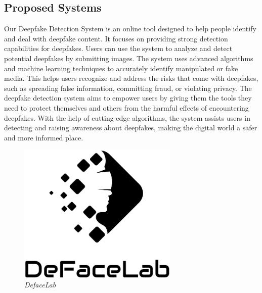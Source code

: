 \subsection{Proposed Systems}
Our Deepfake Detection System is an online tool designed to help people identify and deal with deepfake content. It focuses on providing strong detection capabilities for deepfakes. Users can use the system to analyze and detect potential deepfakes by submitting images. The system uses advanced algorithms and machine learning techniques to accurately identify manipulated or fake media. This helps users recognize and address the risks that come with deepfakes, such as spreading false information, committing fraud, or violating privacy. The deepfake detection system aims to empower users by giving them the tools they need to protect themselves and others from the harmful effects of encountering deepfakes. With the help of cutting-edge algorithms, the system assists users in detecting and raising awareness about deepfakes, making the digital world a safer and more informed place.
\begin{figure}[h]
    \centering
    \includegraphics[width= 3in ]{img/logoblack.png}
    \caption{\textit{DefaceLab}}
\end{figure}